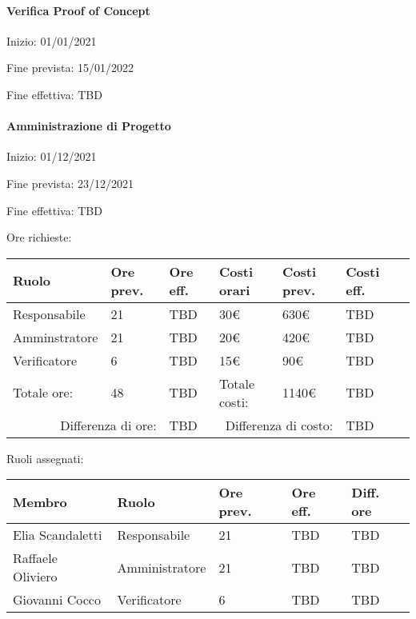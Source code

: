 \documentclass[a4paper, 12pt]{article}
\begin{document}
\paragraph{Verifica Proof of Concept}
Inizio: 01/01/2021\par
Fine prevista: 15/01/2022\par
Fine effettiva: TBD

\paragraph{Amministrazione di Progetto}
Inizio: 01/12/2021\par
Fine prevista: 23/12/2021\par
Fine effettiva: TBD

Ore richieste:\\[0.5em]
\begin{tabular}{|l|l|l||l|l|l|l|}\hline
Ruolo & Ore prev. & Ore eff. & Costi orari & Costi prev. & Costi eff.\\\hline
Responsabile & 21 & TBD & 30\euro & 630\euro & TBD \\\hline
Amminstratore & 21 & TBD & 20\euro & 420\euro & TBD \\\hline
Verificatore & 6 & TBD & 15\euro & 90\euro & TBD \\\hline
Totale ore: & 48 & TBD & Totale costi: & 1140\euro & TBD \\\hline
\multicolumn{2}{|r|}{Differenza di ore:} & TBD & \multicolumn{2}{r|}{Differenza di costo:} & TBD \\\hline
\end{tabular}

Ruoli assegnati:\\[0.5em]
\begin{tabular}{|l|l|l|l|l|}\hline
Membro & Ruolo & Ore prev. & Ore eff. & Diff. ore \\\hline
Elia Scandaletti & Responsabile & 21 & TBD & TBD \\\hline
Raffaele Oliviero & Amministratore & 21 & TBD & TBD \\\hline
Giovanni Cocco & Verificatore & 6 & TBD & TBD \\\hline
\end{tabular}
\end{document}
